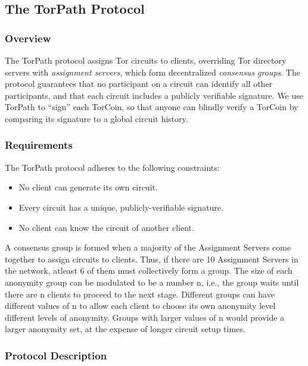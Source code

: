\subsection{The TorPath Protocol}

\subsubsection{Overview}

The TorPath protocol assigns Tor circuits to clients, overriding Tor directory
servers with \textit{assignment servers}, which form decentralized
\textit{consensus groups}. The protocol guarantees that no participant on a
circuit can identify all other participants, and that each circuit includes a
publicly verifiable signature. We use TorPath to ``sign'' each TorCoin, so
that anyone can blindly verify a TorCoin by comparing its signature to a
global circuit history.

\subsubsection{Requirements}

The TorPath protocol adheres to the following constraints:

\begin{itemize}   
\item No client can generate its own circuit.
\item Every circuit has a unique, publicly-verifiable signature.
\item No client can know the circuit of another client.
\end{itemize}

A consensus group is formed when a majority of the Assignment Servers come
together to assign circuits to clients. Thus, if there are 10 Assignment
Servers in the network, atleast 6 of them must collectively form a group.  The
size of each anonymity group can be modulated to be a number n, i.e., the
group waits until there are n clients to proceed to the next stage. Different
groups can have different values of n to allow each client to choose its own
anonymity level different levels of anonymity. Groups with larger values of n
would provide a larger anonymity set, at the expense of longer circuit setup
times.

\subsubsection{Protocol Description}

